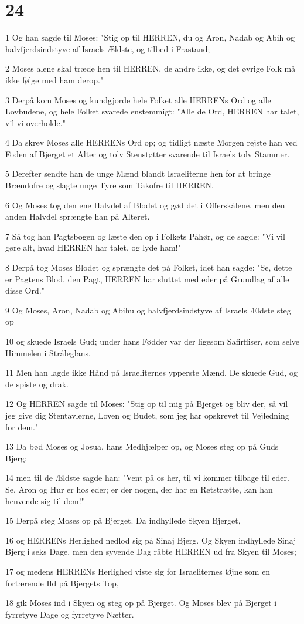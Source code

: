 \chapter{24}

\par 1 Og han sagde til Moses: "Stig op til HERREN, du og Aron, Nadab og Abih og halvfjerdsindstyve af Israels Ældste, og tilbed i Frastand;
\par 2 Moses alene skal træde hen til HERREN, de andre ikke, og det øvrige Folk må ikke følge med ham derop."
\par 3 Derpå kom Moses og kundgjorde hele Folket alle HERRENs Ord og alle Lovbudene, og hele Folket svarede enstemmigt: "Alle de Ord, HERREN har talet, vil vi overholde."
\par 4 Da skrev Moses alle HERRENs Ord op; og tidligt næste Morgen rejste han ved Foden af Bjerget et Alter og tolv Stenstøtter svarende til Israels tolv Stammer.
\par 5 Derefter sendte han de unge Mænd blandt Israeliterne hen for at bringe Brændofre og slagte unge Tyre som Takofre til HERREN.
\par 6 Og Moses tog den ene Halvdel af Blodet og gød det i Offerskålene, men den anden Halvdel sprængte han på Alteret.
\par 7 Så tog han Pagtsbogen og læste den op i Folkets Påhør, og de sagde: "Vi vil gøre alt, hvad HERREN har talet, og lyde ham!"
\par 8 Derpå tog Moses Blodet og sprængte det på Folket, idet han sagde: "Se, dette er Pagtens Blod, den Pagt, HERREN har sluttet med eder på Grundlag af alle disse Ord."
\par 9 Og Moses, Aron, Nadab og Abihu og halvfjerdsindstyve af Israels Ældste steg op
\par 10 og skuede Israels Gud; under hans Fødder var der ligesom Safirfliser, som selve Himmelen i Stråleglans.
\par 11 Men han lagde ikke Hånd på Israeliternes ypperste Mænd. De skuede Gud, og de spiste og drak.
\par 12 Og HERREN sagde til Moses: "Stig op til mig på Bjerget og bliv der, så vil jeg give dig Stentavlerne, Loven og Budet, som jeg har opskrevet til Vejledning for dem."
\par 13 Da bød Moses og Josua, hans Medhjælper op, og Moses steg op på Guds Bjerg;
\par 14 men til de Ældste sagde han: "Vent på os her, til vi kommer tilbage til eder. Se, Aron og Hur er hos eder; er der nogen, der har en Retstrætte, kan han henvende sig til dem!"
\par 15 Derpå steg Moses op på Bjerget. Da indhyllede Skyen Bjerget,
\par 16 og HERRENs Herlighed nedlod sig på Sinaj Bjerg. Og Skyen indhyllede Sinaj Bjerg i seks Dage, men den syvende Dag råbte HERREN ud fra Skyen til Moses;
\par 17 og medens HERRENs Herlighed viste sig for Israeliternes Øjne som en fortærende Ild på Bjergets Top,
\par 18 gik Moses ind i Skyen og steg op på Bjerget. Og Moses blev på Bjerget i fyrretyve Dage og fyrretyve Nætter.

